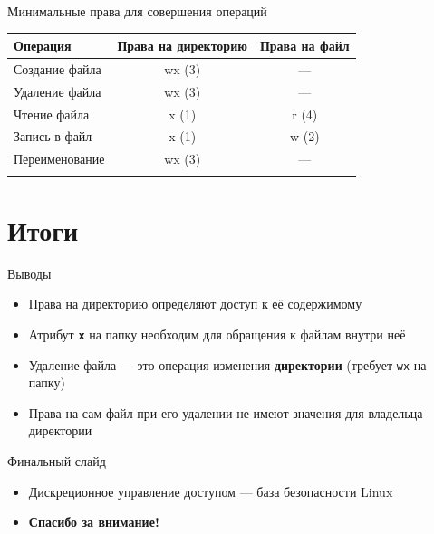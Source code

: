 \documentclass[
  ignorenonframetext,
  aspectratio=169,
  russian,
]{beamer}
\providecommand{\tightlist}{%
  \setlength{\itemsep}{0pt}\setlength{\parskip}{0pt}}
\begin{document}
\begin{frame}{Минимальные права для совершения операций}
\label{ux43cux438ux43dux438ux43cux430ux43bux44cux43dux44bux435-ux43fux440ux430ux432ux430-ux434ux43bux44f-ux441ux43eux432ux435ux440ux448ux435ux43dux438ux44f-ux43eux43fux435ux440ux430ux446ux438ux439}
\begin{longtable}[]{@{}lcc@{}}
\toprule\noalign{}
Операция & Права на директорию & Права на файл \\
\midrule\noalign{}
\endhead
Создание файла & wx (3) & --- \\
Удаление файла & wx (3) & --- \\
Чтение файла & x (1) & r (4) \\
Запись в файл & x (1) & w (2) \\
Переименование & wx (3) & --- \\
\bottomrule\noalign{}
\end{longtable}
\end{frame}

\section{Итоги}\label{ux438ux442ux43eux433ux438}

\begin{frame}[fragile]{Выводы}
\label{ux432ux44bux432ux43eux434ux44b}
\begin{itemize}[<+->]
\tightlist
\item
  Права на директорию определяют доступ к её содержимому
\item
  Атрибут \textbf{\texttt{x}} на папку необходим для обращения к файлам
  внутри неё
\item
  Удаление файла --- это операция изменения \textbf{директории} (требует
  \texttt{wx} на папку)
\item
  Права на сам файл при его удалении не имеют значения для владельца
  директории
\end{itemize}
\end{frame}

\begin{frame}{Финальный слайд}
\label{ux444ux438ux43dux430ux43bux44cux43dux44bux439-ux441ux43bux430ux439ux434}
\begin{itemize}[<+->]
\tightlist
\item
  Дискреционное управление доступом --- база безопасности Linux
\item
  \textbf{Спасибо за внимание!}
\end{itemize}
\end{frame}
\end{document}
